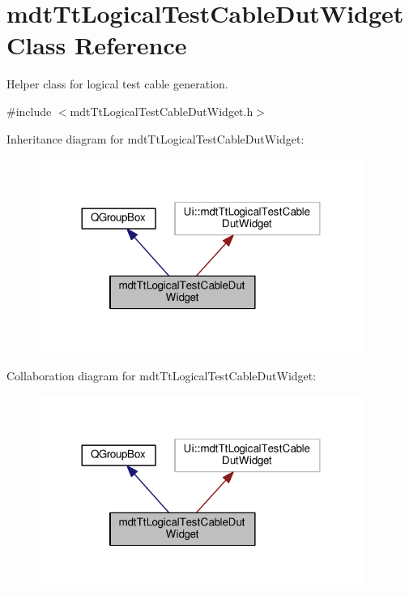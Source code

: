 \hypertarget{classmdt_tt_logical_test_cable_dut_widget}{\section{mdt\-Tt\-Logical\-Test\-Cable\-Dut\-Widget Class Reference}
\label{classmdt_tt_logical_test_cable_dut_widget}
}


Helper class for logical test cable generation.  




{\ttfamily \#include $<$mdt\-Tt\-Logical\-Test\-Cable\-Dut\-Widget.\-h$>$}



Inheritance diagram for mdt\-Tt\-Logical\-Test\-Cable\-Dut\-Widget\-:
\nopagebreak
\begin{figure}[H]
\begin{center}
\leavevmode
\includegraphics[width=300pt]{classmdt_tt_logical_test_cable_dut_widget__inherit__graph}
\end{center}
\end{figure}


Collaboration diagram for mdt\-Tt\-Logical\-Test\-Cable\-Dut\-Widget\-:
\nopagebreak
\begin{figure}[H]
\begin{center}
\leavevmode
\includegraphics[width=300pt]{classmdt_tt_logical_test_cable_dut_widget__coll__graph}
\end{center}
\end{figure}
